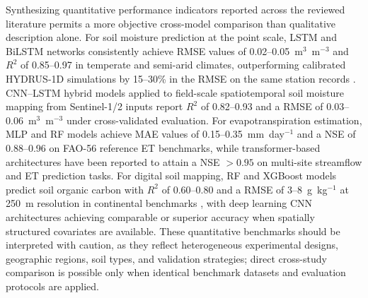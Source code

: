 \documentclass[land,review,accept,pdftex,oneauthor]{Definitions/mdpi}
\begin{document}
{Synthesizing quantitative performance indicators reported across the reviewed literature permits a more objective cross-model comparison than qualitative description alone. For soil moisture prediction at the point scale, LSTM and BiLSTM networks consistently achieve RMSE values of 0.02--0.05~m$^3$~m$^{-3}$ and $R^2$ of 0.85--0.97 in temperate and semi-arid climates, outperforming calibrated HYDRUS-1D simulations by 15--30\% in the RMSE on the same station records \citep{Kratzert2018}. CNN--LSTM hybrid models applied to field-scale spatiotemporal soil moisture mapping from Sentinel-1/2 inputs report $R^2$ of 0.82--0.93 and a RMSE of 0.03--0.06~m$^3$~m$^{-3}$ under cross-validated evaluation. For evapotranspiration estimation, MLP and RF models achieve MAE values of 0.15--0.35~mm~day$^{-1}$ and a NSE of 0.88--0.96 on FAO-56 reference ET benchmarks, while transformer-based architectures have been reported to attain a NSE $> 0.95$ on multi-site streamflow and ET prediction tasks. For digital soil mapping, RF and XGBoost models predict soil organic carbon with $R^2$ of 0.60--0.80 and a RMSE of 3--8~g~kg$^{-1}$ at 250~m resolution in continental benchmarks \citep{Hengl2017}, with deep learning CNN architectures achieving comparable or superior accuracy when spatially structured covariates are available. These quantitative benchmarks should be interpreted with caution, as they reflect heterogeneous experimental designs, geographic regions, soil types, and validation strategies; direct cross-study comparison is possible only when identical benchmark datasets and evaluation protocols are applied.}
\end{document}
